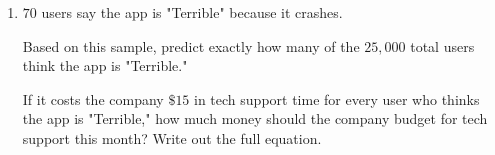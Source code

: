 \documentclass[12pt, letterpaper, fleqn]{article}
\begin{document}
\vspace{3mm}

\begin{enumerate}[itemsep=5.5cm, leftmargin=0.6cm, resume]
\item $70$ users say the app is "Terrible" because it crashes.

Based on this sample, predict exactly how many of the $25,000$ total users think the app is "Terrible." 

If it costs the company $\$15$ in tech support time for every user who thinks the app is "Terrible," how much money should the company budget for tech support this month? Write out the full equation.
\end{enumerate}
\end{document}
